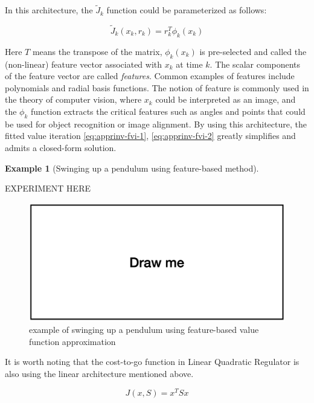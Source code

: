 \documentclass[
]{book}
\theoremstyle{definition}
\theoremstyle{definition}
\newtheorem{example}{Example}[chapter]
\theoremstyle{definition}
\theoremstyle{definition}
\theoremstyle{remark}
\begin{document}
In this architecture, the \(\tilde J_k\) function could be parameterized as follows:

\begin{equation}
\tilde J_k(x_k, r_k)=r_k^T \phi_k(x_k)
\end{equation}

Here \(T\) means the transpose of the matrix, \(\phi_k(x_k)\) is pre-selected and called the (non-linear) feature vector associated with \(x_k\) at time \(k\). The scalar components of the feature vector are called \emph{features}. Common examples of features include polynomials and radial basis functions.
The notion of feature is commonly used in the theory of computer vision, where \(x_k\) could be interpreted as an image, and the \(\phi_k\) function extracts the critical features such as angles and points that could be used for object recognition or image alignment.
By using this architecture, the fitted value iteration \eqref{eq:apprinv-fvi-1}, \eqref{eq:apprinv-fvi-2} greatly simplifies and admits a closed-form solution.

\begin{example}[Swinging up a pendulum using feature-based method]
\protect\hypertarget{exm:featurebasedswingingupapendulum}{}\label{exm:featurebasedswingingupapendulum}

{EXPERIMENT HERE}

\begin{figure}

{\centering \includegraphics[width=0.6\linewidth]{images/drawme} 

}

\caption{example of swinging up a pendulum using feature-based value function approximation}\label{fig:pendulum-feature-example}
\end{figure}

\end{example}

It is worth noting that the cost-to-go function in Linear Quadratic Regulator is also using the linear architecture mentioned above.

\begin{equation}
J(x,S)=x^T S x
\end{equation}
\end{document}
